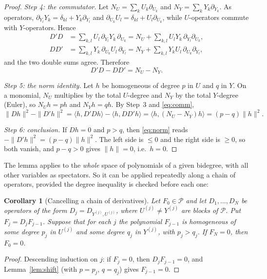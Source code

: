 \documentclass[11pt]{article}
\newtheorem{corollary}[theorem]{Corollary}
\theoremstyle{remark}
\newcommand{\D}[2]{D_{#1,#2}}
\newcommand{\PP}{\mathcal P}
\begin{document}
\begin{proof}
\emph{Step 4: the commutator.} Let
$N_U=\sum_k U_k\partial_{U_k}$ and $N_Y=\sum_k Y_k\partial_{Y_k}$. As
operators, $\partial_{Y_l}Y_k=\delta_{kl}+Y_k\partial_{Y_l}$ and
$\partial_{U_k}U_l=\delta_{kl}+U_l\partial_{U_k}$, while $U$-operators
commute with $Y$-operators. Hence
\begin{align*}
 D'D&=\sum_{k,l}U_l\,\partial_{Y_l}Y_k\,\partial_{U_k}
    =N_U+\sum_{k,l}U_lY_k\,\partial_{Y_l}\partial_{U_k},\\
 DD'&=\sum_{k,l}Y_k\,\partial_{U_k}U_l\,\partial_{Y_l}
    =N_Y+\sum_{k,l}Y_kU_l\,\partial_{U_k}\partial_{Y_l},
\end{align*}
and the two double sums agree. Therefore
\begin{equation}\label{eq:comm}
 D'D-DD'=N_U-N_Y .
\end{equation}

\emph{Step 5: the norm identity.} Let $h$ be homogeneous of degree $p$ in
$U$ and $q$ in $Y$. On a monomial, $N_U$ multiplies by the total
$U$-degree and $N_Y$ by the total $Y$-degree (Euler), so $N_Uh=ph$ and
$N_Yh=qh$. By Step~3 and \eqref{eq:comm},
\begin{equation}\label{eq:norm}
 \|Dh\|^2-\|D'h\|^2
 =\langle h,D'Dh\rangle-\langle h,DD'h\rangle
 =\langle h,(N_U-N_Y)h\rangle
 =(p-q)\|h\|^2 .
\end{equation}

\emph{Step 6: conclusion.} If $Dh=0$ and $p>q$, then \eqref{eq:norm} reads
$-\|D'h\|^2=(p-q)\|h\|^2$. The left side is $\le0$ and the right side is
$\ge0$, so both vanish, and $p-q>0$ gives $\|h\|=0$, i.e.\ $h=0$.
\end{proof}

The lemma applies to the \emph{whole} space of polynomials of a given
bidegree, with all other variables as spectators. So it can be applied
repeatedly along a chain of operators, provided the degree inequality is
checked before each one:

\begin{corollary}[Cancelling a chain of derivatives]\label{cor:peel}
Let $F_0\in\PP$ and let $D_1,\dots,D_N$ be operators of the form
$D_j=\D{Y^{(j)}}{U^{(j)}}$, where $U^{(j)}\ne Y^{(j)}$ are blocks of $\PP$.
Put $F_j=D_jF_{j-1}$. Suppose that for each $j$ the polynomial $F_{j-1}$ is
homogeneous of some degree $p_j$ in $U^{(j)}$ and some degree $q_j$ in
$Y^{(j)}$, with $p_j>q_j$. If $F_N=0$, then $F_0=0$.
\end{corollary}

\begin{proof}
Descending induction on $j$: if $F_j=0$, then $D_jF_{j-1}=0$, and
Lemma~\ref{lem:shift} (with $p=p_j$, $q=q_j$) gives $F_{j-1}=0$.
\end{proof}
\end{document}
